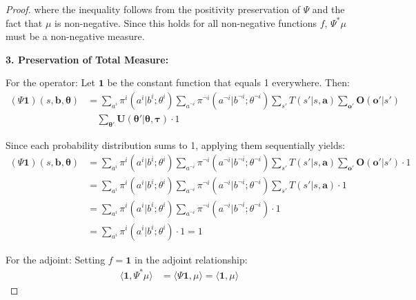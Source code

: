 \begin{proof}
    where the inequality follows from the positivity preservation of $\Psi$ and the
    fact that $\mu$ is non-negative. Since this holds for all non-negative
    functions $f$, $\Psi^{*}\mu$ must be a non-negative measure.

    \textbf{3. Preservation of Total Measure:}

    For the operator: Let $\mathbf{1}$ be the constant function that equals 1
    everywhere. Then:
    \begin{align}
        (\Psi \mathbf{1})(s, \boldsymbol{b}, \boldsymbol{\theta}) & = \sum_{a^i}\pi^{i}(a^{i}|b^{i}; \theta^{i}) \sum_{a^{\neg i}}\pi^{\neg i}(a^{\neg i}|b^{\neg i}; \theta^{\neg i}) \sum_{s'}T(s'|s, \boldsymbol{a}) \sum_{\boldsymbol{o}'}\boldsymbol{O}(\boldsymbol{o}'|s') \\
                                                                  & \quad \sum_{\boldsymbol{\theta}'}\boldsymbol{U}(\boldsymbol{\theta}'|\boldsymbol{\theta}, \boldsymbol{\tau}) \cdot 1
    \end{align}

    Since each probability distribution sums to 1, applying them sequentially
    yields:
    \begin{align}
        (\Psi \mathbf{1})(s, \boldsymbol{b}, \boldsymbol{\theta}) & = \sum_{a^i}\pi^{i}(a^{i}|b^{i}; \theta^{i}) \sum_{a^{\neg i}}\pi^{\neg i}(a^{\neg i}|b^{\neg i}; \theta^{\neg i}) \sum_{s'}T(s'|s, \boldsymbol{a}) \sum_{\boldsymbol{o}'}\boldsymbol{O}(\boldsymbol{o}'|s') \cdot 1 \\
                                                                  & = \sum_{a^i}\pi^{i}(a^{i}|b^{i}; \theta^{i}) \sum_{a^{\neg i}}\pi^{\neg i}(a^{\neg i}|b^{\neg i}; \theta^{\neg i}) \sum_{s'}T(s'|s, \boldsymbol{a}) \cdot 1                                                          \\
                                                                  & = \sum_{a^i}\pi^{i}(a^{i}|b^{i}; \theta^{i}) \sum_{a^{\neg i}}\pi^{\neg i}(a^{\neg i}|b^{\neg i}; \theta^{\neg i}) \cdot 1                                                                                           \\
                                                                  & = \sum_{a^i}\pi^{i}(a^{i}|b^{i}; \theta^{i}) \cdot 1 = 1
    \end{align}

    For the adjoint: Setting $f = \mathbf{1}$ in the adjoint relationship:
    \begin{align}
        \langle \mathbf{1}, \Psi^{*}\mu \rangle & = \langle \Psi \mathbf{1}, \mu \rangle = \langle \mathbf{1}, \mu \rangle
    \end{align}


\end{proof}
